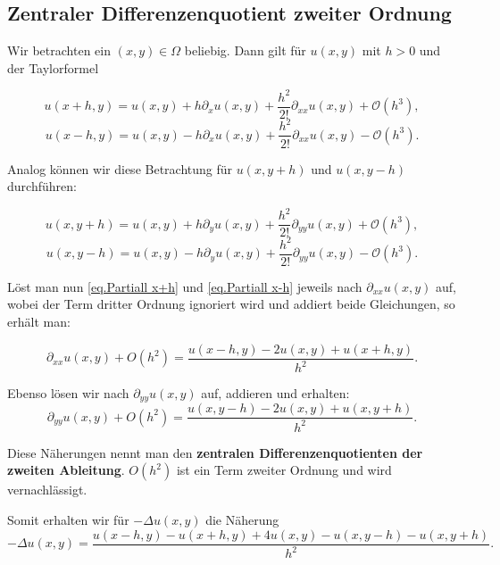 \subsection{Zentraler Differenzenquotient zweiter Ordnung}\label{ss.Differenzenquotient zweiter Ordnung}

Wir betrachten ein $(x,y) \in \Omega$ beliebig. Dann gilt für $u(x,y)$ mit $h > 0$ und der Taylorformel

\begin{equation}
u(x+h,y) = u(x,y) + h \partial_{x} u(x,y) + \frac {h^{2}} {2!} \partial_{xx} u(x,y) + \mathcal{O}(h^{3}),\label{eq.Partiall x+h}
\end{equation}
\begin{equation}
u(x-h,y) = u(x,y) - h \partial_{x} u(x,y) + \frac {h^{2}} {2!} \partial_{xx} u(x,y) - \mathcal{O}(h^{3}).\label{eq.Partiall x-h}
\end{equation}

Analog können wir diese Betrachtung für $u(x,y+h)$ und $u(x,y-h)$ durchführen:

\begin{equation}
u(x,y+h) = u(x,y) + h \partial_{y} u(x,y) + \frac {h^{2}} {2!} \partial_{yy} u(x,y) + \mathcal{O}(h^{3}),
\end{equation}
\begin{equation}
u(x,y-h) = u(x,y) - h \partial_{y} u(x,y) + \frac {h^{2}} {2!} \partial_{yy} u(x,y) - \mathcal{O}(h^{3}).
\end{equation}

Löst man nun \autoref{eq.Partiall x+h} und \autoref{eq.Partiall x-h} jeweils nach $\partial_{xx} u(x,y)$ auf, wobei der Term dritter Ordnung ignoriert wird und addiert beide Gleichungen, so erhält man:

\begin{equation}
\partial_{xx} u(x,y) + O(h^{2}) = \frac {u(x-h,y) - 2u(x,y) + u(x+h,y)} {h^{2}}.
\end{equation}

Ebenso lösen wir nach $\partial_{yy} u(x,y)$ auf, addieren und erhalten:
\begin{equation}
\partial_{yy} u(x,y) + O(h^{2}) = \frac {u(x,y-h) - 2u(x,y) + u(x,y+h)} {h^{2}}.
\end{equation}

Diese Näherungen nennt man den \textbf{zentralen Differenzenquotienten der zweiten Ableitung}. $O(h^{2})$ ist ein Term zweiter Ordnung und wird vernachlässigt.

Somit erhalten wir für $-\Delta u(x,y)$ die Näherung
\begin{equation}
-\Delta u(x,y) = \frac {u(x-h,y) - u(x+h,y) + 4u(x,y) - u(x,y-h) - u(x,y+h)} {h^{2}}.\label{eq.Differenzenquotienten}
\end{equation}

